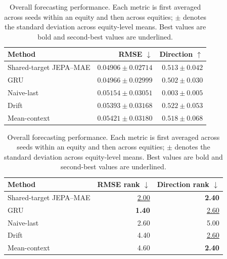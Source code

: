 \begin{table}[t]
\centering
\small
\caption{Overall forecasting performance. Each metric is first averaged across seeds within an equity and then across equities; $\pm$ denotes the standard deviation across equity-level means. Best values are bold and second-best values are underlined.}
\label{tab:main_metrics}
\begin{tabular}{lrr}
\toprule
Method & RMSE $\downarrow$ & Direction $\uparrow$ \\
\midrule
Shared-target JEPA--MAE & \textbf{$0.04906 \pm 0.02714$} & $0.513 \pm 0.042$ \\
GRU & \underline{$0.04966 \pm 0.02999$} & $0.502 \pm 0.030$ \\
Naive-last & $0.05154 \pm 0.03051$ & $0.003 \pm 0.005$ \\
Drift & $0.05393 \pm 0.03168$ & \textbf{$0.522 \pm 0.053$} \\
Mean-context & $0.05421 \pm 0.03180$ & \underline{$0.518 \pm 0.068$} \\
\bottomrule
\end{tabular}
\par\medskip
\begin{tabular}{lrr}
\toprule
Method & RMSE rank $\downarrow$ & Direction rank $\downarrow$ \\
\midrule
Shared-target JEPA--MAE & \underline{2.00} & \textbf{2.40} \\
GRU & \textbf{1.40} & \underline{2.60} \\
Naive-last & 2.60 & 5.00 \\
Drift & 4.40 & \underline{2.60} \\
Mean-context & 4.60 & \textbf{2.40} \\
\bottomrule
\end{tabular}
\end{table}
